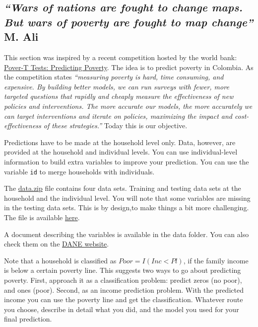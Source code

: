 \documentclass[12pt,onecolumn,A4]{article}
\begin{document}
\subsection{{\it ``Wars of nations are fought to change maps. But wars of poverty are fought to map change''} M. Ali}

This section was inspired by a recent competition hosted by the world bank: \href{https://www.drivendata.org/competitions/50/worldbank-poverty-prediction/page/97/}{Pover-T Tests: Predicting Poverty}. The idea is to predict poverty in Colombia. As the competition states {\it ``measuring poverty is hard, time consuming, and expensive. By building better models, we can run surveys with fewer, more targeted questions that rapidly and cheaply measure the effectiveness of new policies and interventions. The more accurate our models, the more accurately we can target interventions and iterate on policies, maximizing the impact and cost-effectiveness of these strategies.''} Today this is our objective.

Predictions have to be made at the household level only. Data, however, are provided at the household and individual levels. You can use individual-level information to build extra variables to improve your prediction. You can use the variable \texttt{id} to merge households with individuals. 


The \href{https://www.dropbox.com/s/gxmca5teygtxegi/data.zip?dl=0}{data.zip} file contains four data sets. Training and testing data sets at the household and the individual level. You will note that some variables are missing in the testing data sets. This is by design,to make things a bit more challenging. The file is available \href{https://www.dropbox.com/s/gxmca5teygtxegi/data.zip?dl=0}{here}. 

A document describing the variables is available in the data folder. You can also check them on the  \href{http://microdatos.dane.gov.co/index.php/catalog/608/datafile/F1#page=F2&tab=data-dictionary}{DANE website}.


Note that a household is classified as $Poor=I(Inc<Pl)$, if the family income is below a certain poverty line. This suggests two ways to go about predicting poverty. First, approach it as a classification problem: predict zeros (no poor), and ones (poor). Second, as an income prediction problem. With the predicted income you can use the poverty line and get the classification. Whatever route you choose, describe in detail what you did, and the model you used for your final prediction. 
\end{document}
